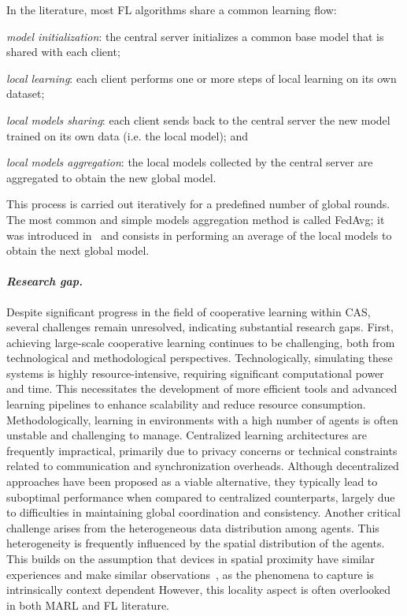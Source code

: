 \documentclass[12pt]{article}
\begin{document}
%
In the literature, most FL algorithms share a common learning flow: 
 \begin{enumerate*}[label=(\roman*)]
	\item \emph{model initialization}: the central server initializes a common base model that is shared with each client;
	\item \emph{local learning}: each client performs one or more steps of local learning on its own dataset;
	\item \emph{local models sharing}: each client sends back to the central server the new model trained on its own data 
     (i.e. the local model); and
	\item \emph{local models aggregation}: the local models collected by the central server are aggregated to obtain the 
     new global model.
 \end{enumerate*}
%
This process is carried out iteratively for a predefined number of global rounds. The most common and simple models
 aggregation method is called FedAvg; it was introduced in~\cite{DBLP:conf/aistats/McMahanMRHA17}
 and consists in performing an average of the local models to obtain the next global model.

\paragraph{\emph{Research gap.}}

Despite significant progress in the field of cooperative learning within CAS, 
 several challenges remain unresolved, indicating substantial research gaps.
%
First, achieving large-scale cooperative learning continues to be challenging, both from technological 
 and methodological perspectives. 
% 
Technologically, simulating these systems is highly resource-intensive, requiring significant 
 computational power and time. 
% 
This necessitates the development of more efficient tools and advanced learning pipelines to enhance 
 scalability and reduce resource consumption.
%
Methodologically, learning in environments with a high number of agents is often unstable and challenging to manage. 
%
Centralized learning architectures are frequently impractical, primarily due to privacy concerns or technical 
 constraints related to communication and synchronization overheads. 
% 
Although decentralized approaches have been proposed as a viable alternative, they typically lead to 
 suboptimal performance when compared to centralized counterparts, largely due to difficulties in maintaining global 
 coordination and consistency.
%
Another critical challenge arises from the heterogeneous data distribution among agents.
% 
This heterogeneity is frequently influenced by the spatial distribution of the agents.
%
This builds on the assumption that devices in spatial proximity have similar experiences and make similar 
 observations~\cite{esterle2022deep}, as
 the phenomena to capture is intrinsically context dependent
% 
However, this locality aspect is often overlooked in both MARL and FL literature.
\end{document}
